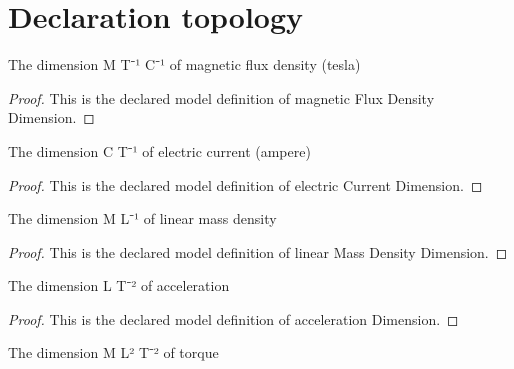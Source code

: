 \section{Declaration topology}
\begin{definition}
  \label{def:physics:phyx-mini-0948:phyxminiproblems-problemphyxmini0948-magneticfluxdensitydimension}
  The dimension M T⁻¹ C⁻¹ of magnetic flux density (tesla)
\end{definition}
\begin{proof}
  This is the declared model definition of magnetic Flux Density Dimension.
\end{proof}
\begin{definition}
  \label{def:physics:phyx-mini-0948:phyxminiproblems-problemphyxmini0948-electriccurrentdimension}
  The dimension C T⁻¹ of electric current (ampere)
\end{definition}
\begin{proof}
  This is the declared model definition of electric Current Dimension.
\end{proof}
\begin{definition}
  \label{def:physics:phyx-mini-0948:phyxminiproblems-problemphyxmini0948-linearmassdensitydimension}
  The dimension M L⁻¹ of linear mass density
\end{definition}
\begin{proof}
  This is the declared model definition of linear Mass Density Dimension.
\end{proof}
\begin{definition}
  \label{def:physics:phyx-mini-0948:phyxminiproblems-problemphyxmini0948-accelerationdimension}
  The dimension L T⁻² of acceleration
\end{definition}
\begin{proof}
  This is the declared model definition of acceleration Dimension.
\end{proof}
\begin{definition}
  \label{def:physics:phyx-mini-0948:phyxminiproblems-problemphyxmini0948-torquedimension}
  The dimension M L² T⁻² of torque
\end{definition}
